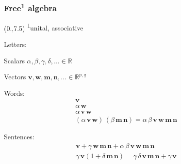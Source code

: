 \documentclass[12pt,xcolor={dvipsnames}]{beamer}
\renewcommand{\vec}{\bm}
\begin{document}
\begin{frame}
  \frametitle{Free\textsuperscript{1} algebra}
  \begin{textblock}{4}(0.,7.5) \scriptsize{\textsuperscript{1}unital,
      associative}
  \end{textblock}

  Letters: \vspace{-0.1in}
  \begin{center}
    Scalars $\alpha, \beta, \gamma, \delta, \ldots \in \mathbb{R}$

    Vectors $\vec{v}, \vec{w}, \vec{m}, \vec{n}, \ldots \in
    \mathbb{R}^{p,q}$
  \end{center}
  \pause \vspace{-0.05in}

  Words: \vspace{-0.2in}
  \begin{gather*}
    \vec{v}
    \\
    \alpha\, \vec{w}
    \\
    \alpha\, \vec{v}\, \vec{w}
    \\
    (\alpha\, \vec{v}\, \vec{w})\, (\beta\, \vec{m}\, \vec{n}) =
    \alpha\, \beta\, \vec{v}\, \vec{w}\, \vec{m}\, \vec{n}
  \end{gather*}
  \pause \vspace{-0.2in}

  Sentences: \vspace{-0.15in}
  \begin{gather*}
    \vec{v} + \gamma\, \vec{w}\, \vec{m}\, \vec{n} + \alpha\, \beta\,
    \vec{v}\, \vec{w}\, \vec{m}\, \vec{n}
    \\
    \gamma\, \vec{v}(1 + \delta\, \vec{m}\, \vec{n}) = \gamma\,
    \delta\, \vec{v}\, \vec{m}\, \vec{n} + \gamma\, \vec{v}
  \end{gather*}

\end{frame}
\end{document}

